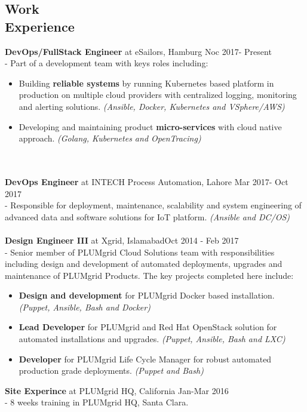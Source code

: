 \documentclass[margin]{res}
\begin{document}
\begin{resume}
\section{Work \\ Experience}
\textbf{DevOps/FullStack Engineer} at eSailors, Hamburg \hfill     Noc 2017- Present \\
- Part of a development team with keys roles including:
    \begin{itemize}
      \item Building \textbf{reliable systems} by running Kubernetes based platform in production on multiple cloud providers with centralized logging, monitoring and alerting solutions. \textit{(Ansible, Docker, Kubernetes and VSphere/AWS)}
      \item Developing and maintaining product \textbf{micro-services} with cloud native approach. \textit{(Golang, Kubernetes and OpenTracing)}
    \end{itemize}    \\ \\
\textbf{DevOps Engineer} at INTECH Process Automation, Lahore \hfill     Mar 2017- Oct 2017 \\
- Responsible for deployment, maintenance, scalability and system engineering of advanced data and software solutions for IoT platform. \textit{(Ansible and DC/OS)}   \\ \\
{\bf Design Engineer III} at Xgrid, Islamabad\hfill     Oct 2014 - Feb 2017 \\
- Senior member of PLUMgrid Cloud Solutions team with responsibilities including design and development of automated deployments, upgrades and maintenance of PLUMgrid Products. The key projects completed here include:
    \begin{itemize}  \itemsep -2pt %
        \item \textbf{Design and development} for PLUMgrid Docker based installation. \textit{(Puppet, Ansible, Bash and Docker)}
        \item \textbf{Lead Developer} for PLUMgrid and Red Hat OpenStack solution for automated installations and upgrades. \textit{(Puppet, Ansible, Bash and LXC)}
        \item \textbf{Developer} for PLUMgrid Life Cycle Manager for robust automated production grade deployments. \textit{(Puppet and Bash)}
    \end{itemize}

\textbf{Site Experince} at PLUMgrid HQ, California \hfill     Jan-Mar 2016 \\
- 8 weeks training in PLUMgrid HQ, Santa Clara.   \\ \\


\end{resume}
\end{document}
